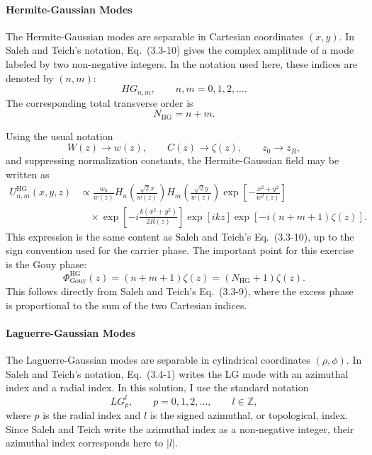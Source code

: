 \begin{resolucao}[Solution]
\paragraph*{Hermite-Gaussian Modes}
The Hermite-Gaussian modes are separable in Cartesian coordinates $(x,y)$. In Saleh and Teich's notation, Eq.~(3.3-10) gives the complex amplitude of a mode labeled by two non-negative integers. In the notation used here, these indices are denoted by $(n,m)$:
\begin{equation}
    HG_{n,m},
    \qquad
    n,m=0,1,2,\ldots.
\end{equation}
The corresponding total transverse order is
\begin{equation}
    N_{\mathrm{HG}}=n+m.
    \label{eq:NHG_definition}
\end{equation}

Using the usual notation
\[
    W(z)\to w(z),
    \qquad
    C(z)\to \zeta(z),
    \qquad
    z_0\to z_R,
\]
and suppressing normalization constants, the Hermite-Gaussian field may be written as
\begin{equation}
    \begin{aligned}
    U_{n,m}^{\mathrm{HG}}(x,y,z)
    &\propto
    \frac{w_0}{w(z)}
    H_n\left(\frac{\sqrt{2}x}{w(z)}\right)
    H_m\left(\frac{\sqrt{2}y}{w(z)}\right)
    \exp\left[-\frac{x^2+y^2}{w^2(z)}\right]
    \\[3pt]
    &\quad\times
    \exp\left[-i\frac{k(x^2+y^2)}{2R(z)}\right]
    \exp\left[ikz\right]
    \exp\left[-i(n+m+1)\zeta(z)\right].
    \end{aligned}
    \label{eq:HG_mode_form}
\end{equation}
This expression is the same content as Saleh and Teich's Eq.~(3.3-10), up to the sign convention used for the carrier phase. The important point for this exercise is the Gouy phase:
\begin{equation}
    \Phi_{\mathrm{Gouy}}^{\mathrm{HG}}(z)
    =
    (n+m+1)\zeta(z)
    =
    (N_{\mathrm{HG}}+1)\zeta(z).
    \label{eq:HG_gouy_order}
\end{equation}
This follows directly from Saleh and Teich's Eq.~(3.3-9), where the excess phase is proportional to the sum of the two Cartesian indices.

\paragraph*{Laguerre-Gaussian Modes}
The Laguerre-Gaussian modes are separable in cylindrical coordinates $(\rho,\phi)$. In Saleh and Teich's notation, Eq.~(3.4-1) writes the LG mode with an azimuthal index and a radial index. In this solution, I use the standard notation
\begin{equation}
    LG_p^l,
    \qquad
    p=0,1,2,\ldots,
    \qquad
    l\in\mathbb{Z},
\end{equation}
where $p$ is the radial index and $l$ is the signed azimuthal, or topological, index. Since Saleh and Teich write the azimuthal index as a non-negative integer, their azimuthal index corresponds here to $|l|$.


\end{resolucao}

